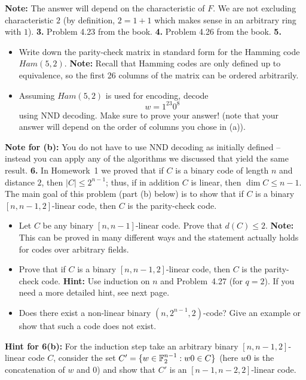 \documentclass[12pt]{amsart}
\begin{document}
{\bf Note:} The answer will depend on the characteristic of $F$. We are not excluding characteristic $2$ (by definition,
$2=1+1$ which makes sense in an arbitrary ring with $1$).
\skv
{\bf 3. }\rm Problem 4.23 from the book.
\skv
{\bf 4. }\rm Problem 4.26 from the book.
\skv
{\bf 5.} 
\begin{itemize}
\item[(a)] Write down the parity-check matrix in standard form for the Hamming code $Ham(5,2)$. {\bf Note:} Recall that Hamming codes are only defined up to equivalence, so the first 26 columns
of the matrix can be ordered arbitrarily.
\item[(b)] Assuming $Ham(5,2)$ is used for encoding, decode $$w=1^{23}0^8$$ using NND decoding. Make sure to prove your answer! (note that your answer will depend on the order of columns you chose in (a)).
\end{itemize}
{\bf Note for (b):} You do not have to use NND decoding as initially defined -- instead you can apply any of the algorithms we discussed that yield the same result. 
\skv
{\bf 6. } In Homework~1 we proved that if $C$ is a binary code of length $n$ and distance $2$, then $|C|\leq 2^{n-1}$; thus, if in addition $C$ is linear,
then $\dim C\leq n-1$. The main goal of this problem (part (b) below) is to show that if $C$ is a binary $[n,n-1,2]$-linear code, then $C$ is the parity-check code. 
\begin{itemize}
\item[(a)] Let $C$ be any binary $[n,n-1]$-linear code. Prove that $d(C)\leq 2$. {\bf Note:} This can be proved in many different ways and the statement actually holds for codes over arbitrary fields.
\item[(b)] Prove that if $C$ is a binary $[n,n-1,2]$-linear code, then $C$ is the parity-check code. 
{\bf Hint:} Use induction on $n$ and Problem~4.27 (for $q=2$). If you need a more detailed hint, see next page.
\item[(c)] Does there exist a non-linear binary $(n,2^{n-1},2)$-code? Give an example or show that such a code does not exist.
\end{itemize}
\newpage
{\bf Hint for 6(b):} For the induction step take an arbitrary binary  $[n,n-1,2]$-linear code $C$, consider the set $C'=\{w\in{\mathbb F}_2^{n-1}: w0\in C\}$
(here $w0$ is the concatenation of $w$ and $0$) and show that $C'$ is an $[n-1,n-2,2]$-linear code.
\end{document}
